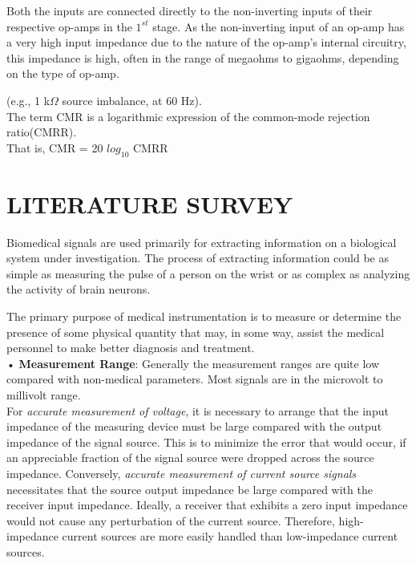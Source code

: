 \documentclass[]{article}
\begin{document}
	Both the inputs are connected directly to the non-inverting inputs of their respective op-amps in the $1^{st}$ stage. As the non-inverting input of an op-amp has a very high input impedance due to the nature of the op-amp's internal circuitry, this impedance is high, often in the range of megaohms to gigaohms, depending on the type of op-amp.
	
	(e.g., 1 k$\Omega$ source imbalance, at 60 Hz).\\
	\vspace{.10cm}The term CMR is a logarithmic expression of the 
	common-mode rejection ratio(CMRR).\\ That is, CMR = 
	20 $log_{10}$ CMRR



\section{LITERATURE SURVEY}

		Biomedical signals  are used primarily for extracting information on a biological system under investigation. The process of extracting information could be as simple as measuring the pulse of a person on the wrist or as complex as analyzing the activity of brain neurons.
		
		The primary purpose of medical instrumentation is to measure or determine the presence of some physical quantity that may, in some way, assist the medical personnel to make better diagnosis and treatment.\\
		
		•	\textbf{Measurement Range}:  Generally the measurement ranges are quite low compared with non-medical parameters. Most signals are in the microvolt to millivolt range.\\
		
	For \textit{accurate measurement of voltage}, it is necessary to arrange that the input impedance of the measuring device must be large compared with the output impedance of the signal source. This is to minimize the error that would occur, if an appreciable fraction of the signal source were dropped across the source impedance. Conversely, \textit{accurate measurement of current source signals} necessitates that the source output impedance be large compared with the receiver input impedance. Ideally, a receiver that exhibits a zero input impedance would not cause any perturbation of the current source. Therefore, high-impedance current sources are more easily handled than low-impedance current sources.\\
		
\end{document}
